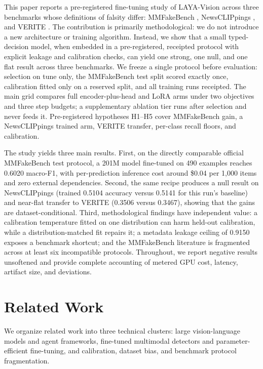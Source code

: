 \documentclass{article} %
\begin{document}
This paper reports a pre-registered fine-tuning study of LAYA-Vision across three benchmarks whose definitions of falsity differ: MMFakeBench \citep{Liu2024MmfakebenchMixedsource}, NewsCLIPpings \citep{Luo2021NewsclippingsAutomatic}, and VERITE \citep{Papadopoulos2023VeriteRobust}. The contribution is primarily methodological: we do not introduce a new architecture or training algorithm. Instead, we show that a small typed-decision model, when embedded in a pre-registered, receipted protocol with explicit leakage and calibration checks, can yield one strong, one null, and one flat result across three benchmarks. We freeze a single protocol before evaluation: selection on tune only, the MMFakeBench test split scored exactly once, calibration fitted only on a reserved split, and all training runs receipted. The main grid compares full encoder-plus-head and LoRA arms under two objectives and three step budgets; a supplementary ablation tier runs after selection and never feeds it. Pre-registered hypotheses H1--H5 cover MMFakeBench gain, a NewsCLIPpings trained arm, VERITE transfer, per-class recall floors, and calibration.

The study yields three main results. First, on the directly comparable official MMFakeBench test protocol, a 201M model fine-tuned on 490 examples reaches 0.6020 macro-F1, with per-prediction inference cost around \$0.04 per 1,000 items and zero external dependencies. Second, the same recipe produces a null result on NewsCLIPpings (trained 0.5104 accuracy versus 0.5141 for this run's baseline) and near-flat transfer to VERITE (0.3506 versus 0.3467), showing that the gains are dataset-conditional. Third, methodological findings have independent value: a calibration temperature fitted on one distribution can harm held-out calibration, while a distribution-matched fit repairs it; a metadata leakage ceiling of 0.9150 exposes a benchmark shortcut; and the MMFakeBench literature is fragmented across at least six incompatible protocols. Throughout, we report negative results unsoftened and provide complete accounting of metered GPU cost, latency, artifact size, and deviations.

\section{Related Work}
\label{sec:related_work}
We organize related work into three technical clusters: large vision-language models and agent frameworks, fine-tuned multimodal detectors and parameter-efficient fine-tuning, and calibration, dataset bias, and benchmark protocol fragmentation.
\end{document}
